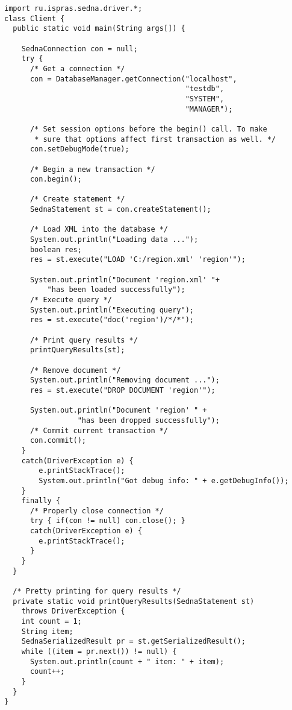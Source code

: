 \documentclass[a4paper,12pt]{article}
\begin{document}
\small{
\begin{verbatim}
import ru.ispras.sedna.driver.*;
class Client {
  public static void main(String args[]) {

    SednaConnection con = null;
    try {
      /* Get a connection */
      con = DatabaseManager.getConnection("localhost",
                                          "testdb",
                                          "SYSTEM",
                                          "MANAGER");

      /* Set session options before the begin() call. To make
       * sure that options affect first transaction as well. */
      con.setDebugMode(true);

      /* Begin a new transaction */
      con.begin();

      /* Create statement */
      SednaStatement st = con.createStatement();

      /* Load XML into the database */
      System.out.println("Loading data ...");
      boolean res;
      res = st.execute("LOAD 'C:/region.xml' 'region'");

      System.out.println("Document 'region.xml' "+
          "has been loaded successfully");
      /* Execute query */
      System.out.println("Executing query");
      res = st.execute("doc('region')/*/*");

      /* Print query results */
      printQueryResults(st);

      /* Remove document */
      System.out.println("Removing document ...");
      res = st.execute("DROP DOCUMENT 'region'");

      System.out.println("Document 'region' " +
                 "has been dropped successfully");
      /* Commit current transaction */
      con.commit();
    }
    catch(DriverException e) {
        e.printStackTrace();
        System.out.println("Got debug info: " + e.getDebugInfo());
    }
    finally {
      /* Properly close connection */
      try { if(con != null) con.close(); }
      catch(DriverException e) {
        e.printStackTrace();
      }
    }
  }

  /* Pretty printing for query results */
  private static void printQueryResults(SednaStatement st)
    throws DriverException {
    int count = 1;
    String item;
    SednaSerializedResult pr = st.getSerializedResult();
    while ((item = pr.next()) != null) {
      System.out.println(count + " item: " + item);
      count++;
    }
  }
}
\end{verbatim}}
\end{document}
